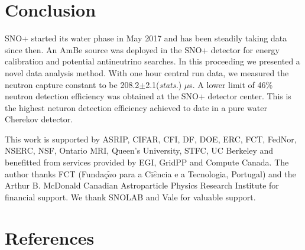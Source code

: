 \documentclass[a4paper]{jpconf}
\begin{document}
\section{Conclusion}

SNO+ started its water phase in May 2017 and has been steadily taking data since then. An AmBe source was deployed in the SNO+ detector for energy calibration and potential antineutrino searches. In this proceeding we presented a novel data analysis method. With one hour central run data, we measured the neutron capture constant to be 208.2$\pm$2.1(\textit{stats.}) $\mu$s. A lower limit of 46\% neutron detection efficiency was obtained at the SNO+ detector center. This is the highest neturon detection efficiency achieved to date in a pure water Cherekov detector. 


\ack{}

This work is supported by ASRIP, CIFAR, CFI, DF, DOE, ERC, FCT, FedNor, NSERC, NSF, Ontario MRI, Queen's University, STFC, UC Berkeley and benefitted from services provided by EGI, GridPP and Compute Canada. The author thanks FCT (Funda\c{c}$\tilde{a}$o para a Ci$\hat{e}$ncia e a Tecnologia, Portugal) and the Arthur B. McDonald Canadian Astroparticle Physics Research Institute for financial support. We thank SNOLAB and Vale for valuable support.

\section*{References}


\end{document}
